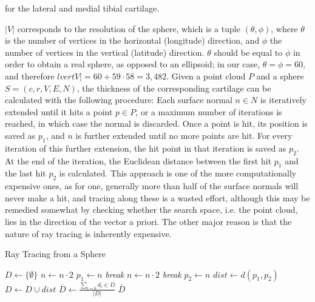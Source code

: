 for the lateral and medial tibial cartilage.
\bigskip
\par\noindent
$\lvert V \rvert$ corresponds to the resolution of the sphere, which is a tuple $(\theta, \phi)$, where $\theta$ is the number of vertices in the horizontal (longitude) direction, and $\phi$ the number of vertices in the vertical (latitude) direction. $\theta$ should be equal to $\phi$ in order to obtain a real sphere, as opposed to an ellipsoid; in our case, $\theta = \phi = 60$, and therefore $lvert V \rvert = 60 + 59 \cdot 58 = 3,482$.
Given a point cloud $P$ and a sphere $S = (c, r, V, E, N)$, the thickness of the corresponding cartilage can be calculated with the following procedure:
Each surface normal $n \in N$ is iteratively extended until it hits a point $p \in P$, or a maximum number of iterations is reached, in which case the normal is discarded. Once a point is hit, its position is saved as $p_1$, and $n$ is further extended until no more points are hit. For every iteration of this further extension, the hit point in that iteration is saved as $p_2$. At the end of the iteration, the Euclidean distance between the first hit $p_1$ and the last hit $p_2$ is calculated.
This approach is one of the more computationally expensive ones, as for one, generally more than half of the surface normals will never make a hit, and tracing along these is a wasted effort, although this may be remedied somewhat by checking whether the search space, i.e. the point cloud, lies in the direction of the vector a priori. The other major reason is that the nature of ray tracing is inherently expensive.
\begin{algorithm}
	\caption{Ray Tracing from a Sphere}
	\label{algo:raytracing}
	\begin{algorithmic}[1]
		\State $D \gets \{\emptyset\}$
			\Repeat
				\State $n \gets n \cdot 2$
					\State $p_1 \gets n$
					\State \textit{break}
				\EndIf
			\Repeat
				\State $n \gets n \cdot 2$
					\State \textit{break}
				\EndIf
				\State $p_2 \gets n$
			\State $dist \gets d(p_1, p_2)$
			\State $D \gets D \cup dist$
			\State
		\EndFor 
		\State $\overline{D} \gets \frac{\sum_{i = 0} d_{i} \in D}{\lvert D \rvert}$
		\State
		\Return $\overline{D}$
		\EndProcedure
	\end{algorithmic}
\end{algorithm}
